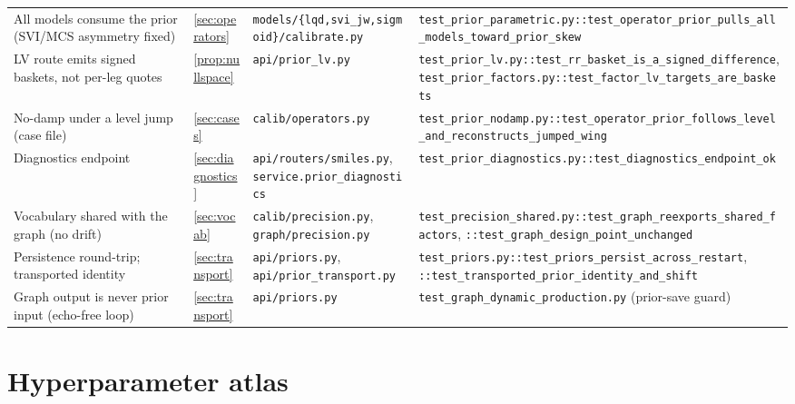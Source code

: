 \documentclass[11pt]{article}
\begin{document}
\begin{longtable}{@{}p{}p{}p{}p{}@{}}
All models consume the prior (SVI/MCS asymmetry fixed) &
\cref{sec:operators} &
\nolinkurl{models/{lqd,svi_jw,sigmoid}/calibrate.py} &
\nolinkurl{test_prior_parametric.py::test_operator_prior_pulls_all_models_toward_prior_skew}\\
LV route emits signed baskets, not per-leg quotes &
\cref{prop:nullspace} &
\nolinkurl{api/prior_lv.py} &
\nolinkurl{test_prior_lv.py::test_rr_basket_is_a_signed_difference}, \nolinkurl{test_prior_factors.py::test_factor_lv_targets_are_baskets}\\
No-damp under a level jump (case file) &
\cref{sec:cases} &
\nolinkurl{calib/operators.py} &
\nolinkurl{test_prior_nodamp.py::test_operator_prior_follows_level_and_reconstructs_jumped_wing}\\
Diagnostics endpoint &
\cref{sec:diagnostics} &
\nolinkurl{api/routers/smiles.py}, \nolinkurl{service.prior_diagnostics} &
\nolinkurl{test_prior_diagnostics.py::test_diagnostics_endpoint_ok}\\
Vocabulary shared with the graph (no drift) &
\cref{sec:vocab} &
\nolinkurl{calib/precision.py}, \nolinkurl{graph/precision.py} &
\nolinkurl{test_precision_shared.py::test_graph_reexports_shared_factors}, \nolinkurl{::test_graph_design_point_unchanged}\\
Persistence round-trip; transported identity &
\cref{sec:transport} &
\nolinkurl{api/priors.py}, \nolinkurl{api/prior_transport.py} &
\nolinkurl{test_priors.py::test_priors_persist_across_restart}, \nolinkurl{::test_transported_prior_identity_and_shift}\\
Graph output is never prior input (echo-free loop) &
\cref{sec:transport} &
\nolinkurl{api/priors.py} &
\nolinkurl{test_graph_dynamic_production.py} (prior-save guard)\\
\bottomrule
\end{longtable}
\endgroup

\appendix
\section{Hyperparameter atlas}
\label{app:atlas}
\end{document}

